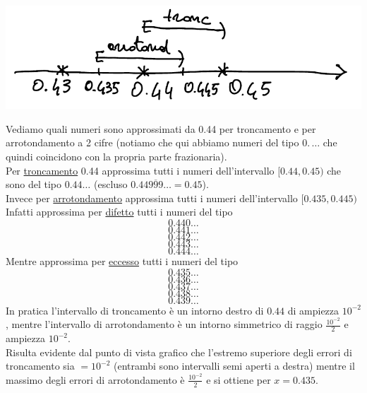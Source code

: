 \begin{center}
    \includegraphics[scale=0.65]{foto/img1}
\end{center}
Vediamo quali numeri sono approssimati da 0.44 per troncamento e per arrotondamento a 2 cifre (notiamo che qui abbiamo numeri del tipo $0.\,\dotsc$ che quindi coincidono con la propria parte frazionaria).\\
Per \uline{troncamento} 0.44 approssima tutti i numeri dell'intervallo $[0.44 , 0.45)$ che sono del tipo $0.44\dotsc$ (escluso $0.44\overline{999}\dotsc = 0.45$).\\
Invece per \uline{arrotondamento} approssima tutti i numeri dell'intervallo $[0.435 , 0.445)$ \\ 
Infatti approssima per \uline{difetto} tutti i numeri del tipo \[ 0.440\dotsc \] \[ 0.441\dotsc \] \[ 0.442\dotsc \] \[ 0.443\dotsc \] \[ 0.444\dotsc \]
Mentre approssima per \uline{eccesso} tutti i numeri del tipo \[ 0.435\dotsc \] \[ 0.436\dotsc \] \[ 0.437\dotsc \] \[ 0.438\dotsc \] \[ 0.439\dotsc \]
In pratica l'intervallo di troncamento è un intorno destro di $0.44$ di ampiezza $10^{-2}$, mentre l'intervallo di arrotondamento è un intorno simmetrico di raggio $\frac{10^{-2}}{2}$ e ampiezza $10^{-2}$.\\
Risulta evidente dal punto di vista grafico che l'estremo superiore degli errori di troncamento sia $= 10^{-2}$ (entrambi sono intervalli semi aperti a destra) mentre il massimo degli errori di arrotondamento è $\frac{10^{-2}}{2}$ e si ottiene per $x = 0.435$.
\newpage